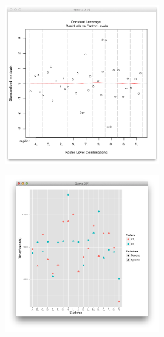 \begin{figure}[t]
    \centering
    \includegraphics[width=0.6\textwidth]{images/grafico3.png}
    \caption{}
    \label{fig:grafico3}
\end{figure}

\begin{figure}[t]
    \centering
    \includegraphics[width=0.6\textwidth]{images/dotplot.png}
    \caption{}
    \label{fig:dotplot}
\end{figure}